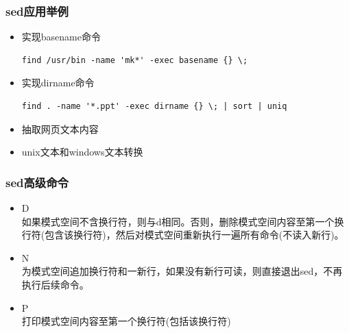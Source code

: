 \documentclass[xcolor=svgnames,presentation]{beamer}
\begin{document}
\begin{frame}[fragile]
\frametitle{sed应用举例}
\label{sec-2-1-11}
\begin{itemize}

\item 实现basename命令\\
\label{sec-2-1-11-1}%
\begin{verbatim}
find /usr/bin -name 'mk*' -exec basename {} \;
\end{verbatim}

\item 实现dirname命令\\
\label{sec-2-1-11-2}%
\begin{verbatim}
find . -name '*.ppt' -exec dirname {} \; | sort | uniq
\end{verbatim}

\item 抽取网页文本内容
\label{sec-2-1-11-3}%

\item unix文本和windows文本转换
\label{sec-2-1-11-4}%
\end{itemize} %
\end{frame}
\begin{frame}
\frametitle{sed高级命令}
\label{sec-2-1-12}
\begin{itemize}

\item D\\
\label{sec-2-1-12-1}%
如果模式空间不含换行符，则与d相同。否则，删除模式空间内容至第一个换行符(包含该换行符)，然后对模式空间重新执行一遍所有命令(不读入新行)。

\item N\\
\label{sec-2-1-12-2}%
为模式空间追加换行符和一新行，如果没有新行可读，则直接退出sed，不再执行后续命令。

\item P\\
\label{sec-2-1-12-3}%
打印模式空间内容至第一个换行符(包括该换行符)
\end{itemize} %
\end{frame}
\end{document}
